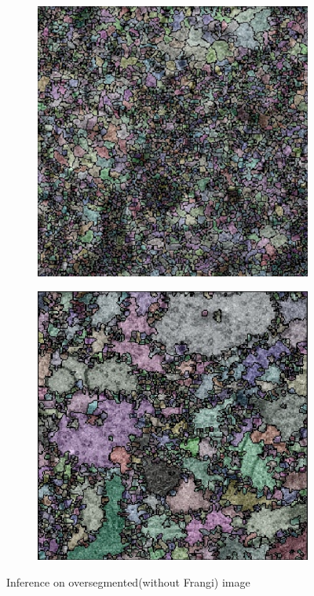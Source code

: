 \documentclass[12pt, a4paper]{scrartcl}
\begin{document}
\begin{figure}[H]
\centering
\begin{subfigure}{.35\textwidth}
  \centering
  \includegraphics[width=.8\linewidth]{os2}
  \label{fig:os1}
\end{subfigure}%
\begin{subfigure}{.35\textwidth}
  \centering
  \includegraphics[width=.8\linewidth]{os3}
  \label{fig:os2}
\end{subfigure}

\label{fig:oversegment}
\caption{Inference on oversegmented(without Frangi) image}
\end{figure}
\end{document}
